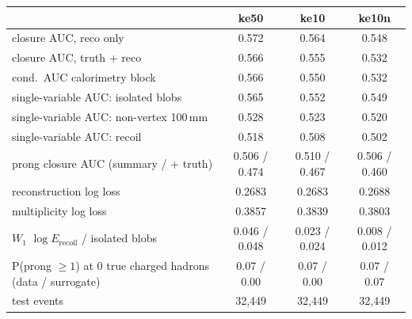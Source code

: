 \begin{tabular}{lccc}
\toprule
 & ke50 & ke10 & ke10n \\
\midrule
closure AUC, reco only & 0.572 & 0.564 & 0.548 \\
closure AUC, truth + reco & 0.566 & 0.555 & 0.532 \\
cond.\ AUC calorimetry block & 0.566 & 0.550 & 0.532 \\
single-variable AUC: isolated blobs & 0.565 & 0.552 & 0.549 \\
single-variable AUC: non-vertex 100\,mm & 0.528 & 0.523 & 0.520 \\
single-variable AUC: recoil & 0.518 & 0.508 & 0.502 \\
prong closure AUC (summary / + truth) & 0.506 / 0.474 & 0.510 / 0.467 & 0.506 / 0.460 \\
reconstruction log loss & 0.2683 & 0.2683 & 0.2688 \\
multiplicity log loss & 0.3857 & 0.3839 & 0.3803 \\
$W_1$ $\log E_\mathrm{recoil}$ / isolated blobs & 0.046 / 0.048 & 0.023 / 0.024 & 0.008 / 0.012 \\
P(prong $\ge 1$) at 0 true charged hadrons (data / surrogate) & 0.07 / 0.00 & 0.07 / 0.00 & 0.07 / 0.07 \\
test events & 32,449 & 32,449 & 32,449 \\
\bottomrule
\end{tabular}
